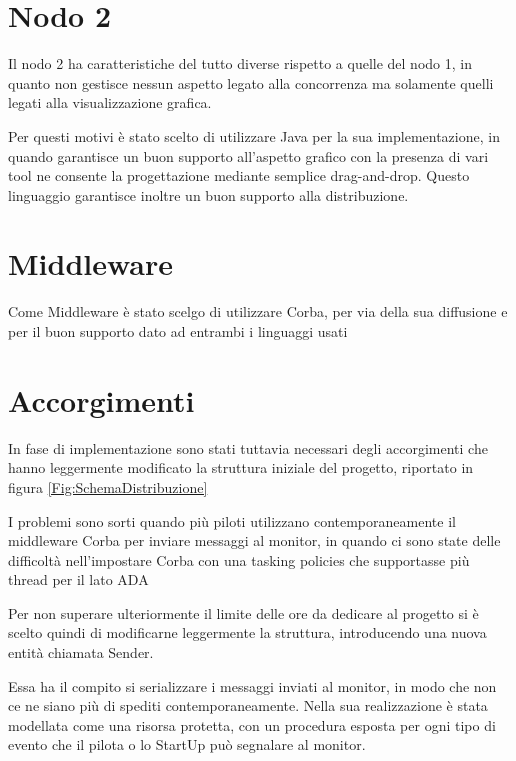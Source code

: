 \documentclass[a4paper,11pt, twoside]{book}
\begin{document}
    \section{Nodo 2}
      Il nodo 2 ha caratteristiche del tutto diverse rispetto a quelle del nodo 1, in quanto non gestisce nessun aspetto
      legato alla concorrenza ma solamente quelli legati alla visualizzazione grafica.
      
      Per questi motivi è stato scelto di utilizzare Java per la sua implementazione, in quando garantisce un buon supporto
      all'aspetto grafico con la presenza di vari tool ne consente la progettazione mediante semplice drag-and-drop.
      Questo linguaggio garantisce inoltre un buon supporto alla distribuzione.
      
    \section{Middleware}
      Come Middleware è stato scelgo di utilizzare Corba, per via della sua diffusione e per il buon supporto dato
      ad entrambi i linguaggi usati
      
    \section{Accorgimenti}
      In fase di implementazione sono stati tuttavia necessari degli accorgimenti che hanno leggermente modificato la struttura 
      iniziale del progetto, riportato in figura \ref{Fig:SchemaDistribuzione}
      
      I problemi sono sorti quando più piloti utilizzano contemporaneamente il middleware Corba per 
      inviare messaggi al monitor, in quando
      ci sono state delle difficoltà nell'impostare Corba con una tasking policies che supportasse più thread per il lato ADA
      
      Per non superare ulteriormente il limite delle ore da dedicare al progetto si è scelto quindi di modificarne leggermente
      la struttura, introducendo una nuova entità chiamata Sender.
      
      Essa ha il compito si serializzare i messaggi inviati al monitor, in modo che non ce ne siano più di spediti
      contemporaneamente. Nella sua realizzazione è stata modellata come una risorsa protetta, con un procedura esposta per
      ogni tipo di evento che il pilota o lo StartUp può segnalare al monitor.
      
      
\end{document}
